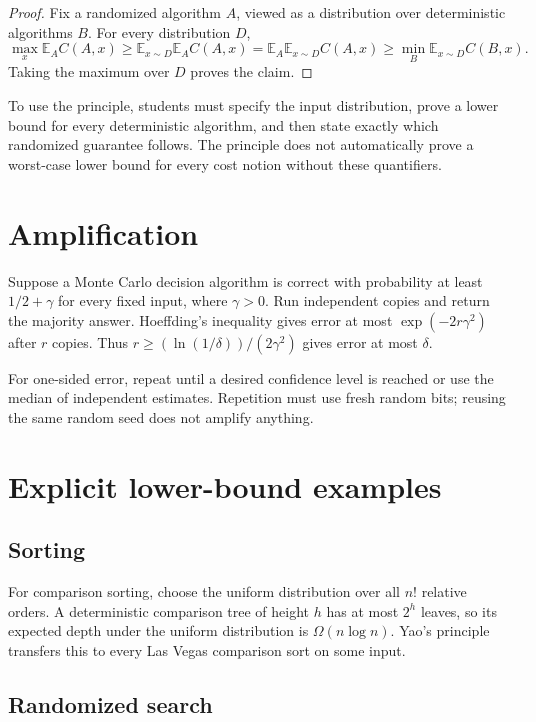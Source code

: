 \begin{proof}[Proof]
Fix a randomized algorithm $A$, viewed as a distribution over deterministic
algorithms $B$.  For every distribution $D$,
\[
 \max_x\mathbb{E}_A C(A,x)
 \geq \mathbb{E}_{x\sim D}\mathbb{E}_A C(A,x)
 =\mathbb{E}_A\mathbb{E}_{x\sim D}C(A,x)
 \geq\min_B\mathbb{E}_{x\sim D}C(B,x).
\]
Taking the maximum over $D$ proves the claim.
\end{proof}

To use the principle, students must specify the input distribution, prove a
lower bound for every deterministic algorithm, and then state exactly which
randomized guarantee follows.  The principle does not automatically prove a
worst-case lower bound for every cost notion without these quantifiers.

\section{Amplification}

Suppose a Monte Carlo decision algorithm is correct with probability at least
$1/2+\gamma$ for every fixed input, where $\gamma>0$.  Run independent copies
and return the majority answer.  Hoeffding's inequality gives error at most
$\exp(-2r\gamma^2)$ after $r$ copies.  Thus
$r\geq(\ln(1/\delta))/(2\gamma^2)$ gives error at most $\delta$.

For one-sided error, repeat until a desired confidence level is reached or
use the median of independent estimates.  Repetition must use fresh random
bits; reusing the same random seed does not amplify anything.

\section{Explicit lower-bound examples}

\subsection{Sorting}

For comparison sorting, choose the uniform distribution over all $n!$
relative orders.  A deterministic comparison tree of height $h$ has at
most $2^h$ leaves, so its expected depth under the uniform distribution is
$\Omega(n\log n)$.  Yao's principle transfers this to every Las Vegas
comparison sort on some input.

\subsection{Randomized search}


